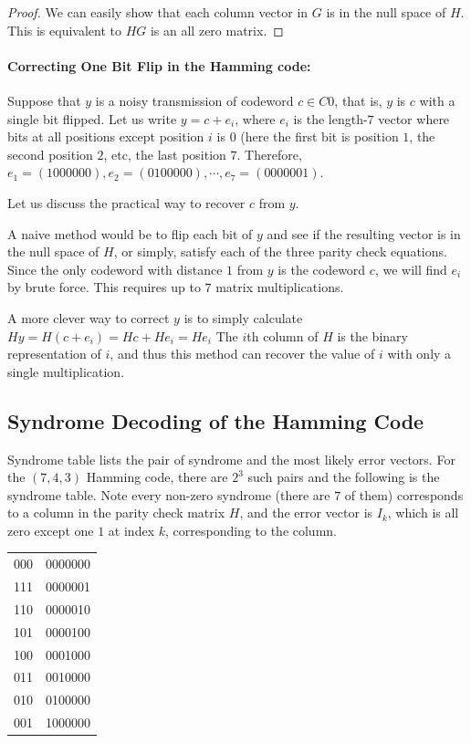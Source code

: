 \begin{proof}
    We can easily show that each column vector in \(G\) is in the null space of \(H\). This is equivalent to \(HG\) is an all zero matrix.  
\end{proof}

\paragraph{Correcting One Bit Flip in the Hamming code:} Suppose that \(y\) is a noisy transmission of codeword \(c \in C0\), that is, \(y\) is \(c\) with a single bit flipped. Let us write \(y = c + e_i\), where \(e_i\) is the length-\(7\) vector where bits at all positions except position \(i\) is \(0\) (here the first bit is position \(1\), the second position \(2\), etc, the last position \(7\). Therefore, \(e_1 = (1000000), e_2 = (0100000), \cdots, e_7 = (0000001).\)

Let us discuss the practical way to recover \(c\) from \(y\).

 A naive method would be to flip each bit of \(y\) and see if the resulting vector is in the null space of \(H\), or simply, satisfy each of the three parity check equations. Since the only codeword with distance \(1\) from \(y\) is the codeword \(c\), we will find \(e_i\) by brute force. This requires up to \(7\) matrix multiplications.


A more clever way to correct \(y\) is to simply calculate
\(Hy = H(c + e_i) = Hc + H e_i = H e_i\)
The \(i\)th column of \(H\) is the binary representation of \(i\), and thus this method can recover the value of \(i\) with only a single multiplication.

\subsection{Syndrome Decoding of the Hamming Code}
Syndrome table lists the pair of syndrome and the most likely error vectors. For the \((7,4,3)\) Hamming code, there are \(2^3\) such pairs and the following is the syndrome table. Note every non-zero syndrome (there are \(7\) of them) corresponds to a column in the parity check matrix \(H\), and the error vector is \(I_k\), which is all zero except one \(1\) at index \(k\), corresponding to the column.

\begin{center}
\begin{tabular}{ c c  }
000 & 0000000 \\ 
111 & 0000001 \\
110 & 0000010 \\
101 & 0000100 \\ 
100 & 0001000 \\
011 & 0010000 \\
010 & 0100000 \\
001 & 1000000 \\    
\end{tabular}
\end{center}


